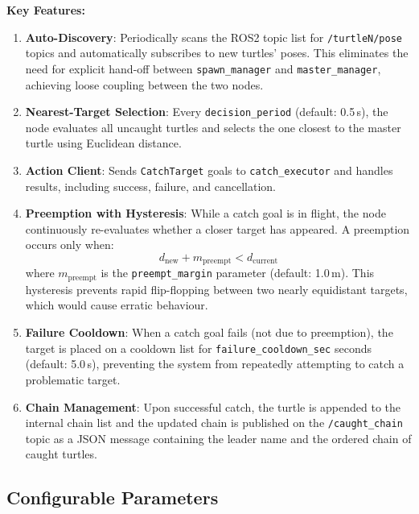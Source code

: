 \textbf{Key Features:}

\begin{enumerate}
  \item \textbf{Auto-Discovery}: Periodically scans the ROS2 topic list for \texttt{/turtleN/pose} topics and automatically subscribes to new turtles' poses. This eliminates the need for explicit hand-off between \texttt{spawn\_manager} and \texttt{master\_manager}, achieving loose coupling between the two nodes.

  \item \textbf{Nearest-Target Selection}: Every \texttt{decision\_period} (default: 0.5\,s), the node evaluates all uncaught turtles and selects the one closest to the master turtle using Euclidean distance.

  \item \textbf{Action Client}: Sends \texttt{CatchTarget} goals to \texttt{catch\_executor} and handles results, including success, failure, and cancellation.

  \item \textbf{Preemption with Hysteresis}: While a catch goal is in flight, the node continuously re-evaluates whether a closer target has appeared. A preemption occurs only when:
  \[
    d_{\text{new}} + m_{\text{preempt}} < d_{\text{current}}
  \]
  where $m_{\text{preempt}}$ is the \texttt{preempt\_margin} parameter (default: 1.0\,m). This hysteresis prevents rapid flip-flopping between two nearly equidistant targets, which would cause erratic behaviour.

  \item \textbf{Failure Cooldown}: When a catch goal fails (not due to preemption), the target is placed on a cooldown list for \texttt{failure\_cooldown\_sec} seconds (default: 5.0\,s), preventing the system from repeatedly attempting to catch a problematic target.

  \item \textbf{Chain Management}: Upon successful catch, the turtle is appended to the internal chain list and the updated chain is published on the \texttt{/caught\_chain} topic as a JSON message containing the leader name and the ordered chain of caught turtles.
\end{enumerate}

\subsection{Configurable Parameters}


